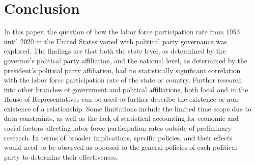 \chapter{Conclusion}

In this paper, the question of how the labor force participation rate from 1953 until 2020 in the United States varied with political party governance was explored. The findings are that both the state level, as determined by the governor's political party affiliation, and the national level, as determined by the president's political party affiliation, had no statistically significant correlation with the labor force participation rate of the state or country. Further research into other branches of government and political affiliations, both local and in the House of Representatives can be used to further describe the existence or non-existence of a relationship. Some limitations include the limited time scope due to data constraints, as well as the lack of statistical accounting for economic and social factors affecting labor force participation rates outside of preliminary research. In terms of broader implications, specific policies, and their effects would need to be observed as opposed to the general policies of each political party to determine their effectiveness.